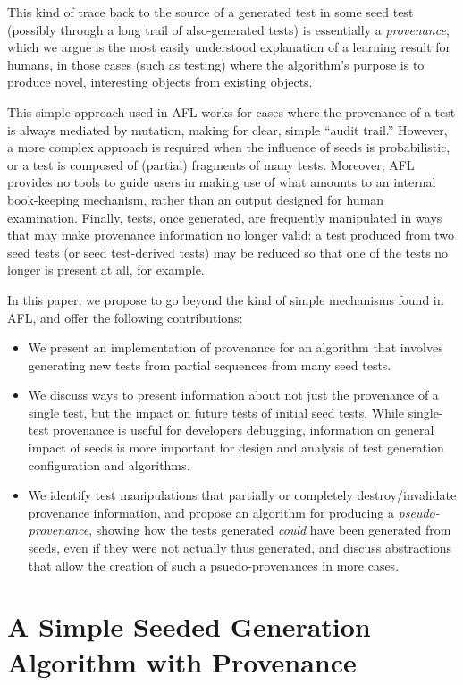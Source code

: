 \documentclass[final]{article}
\begin{document}
This kind of trace back to the source of a generated test in some seed
test (possibly through a long trail of also-generated tests) is
essentially a \emph{provenance}, which we argue is the most easily
understood explanation of a learning result for humans, in those cases
(such as testing) where the algorithm's purpose is to produce
novel, interesting objects from existing objects.

This simple approach used in AFL works for cases where the provenance of a test is
always mediated by mutation, making for clear, simple ``audit trail.''  However, a more complex approach is
required when the influence of seeds is probabilistic, or a test is
composed of (partial) fragments of many tests.  Moreover, AFL provides
no tools to guide users in making use of what amounts to an internal
book-keeping mechanism, rather than an output designed for human
examination.
Finally, tests, once generated, are frequently manipulated in ways
that may make provenance information no longer valid:  a test produced
from two seed tests (or seed test-derived tests) may be reduced
\cite{DD} so that one of the tests no longer is present at all, for example.

In this paper, we propose to go beyond the kind of simple mechanisms
found in AFL, and
offer the following contributions:

\begin{itemize}
\item We present an implementation of provenance for an algorithm that involves
  generating new tests from partial sequences from many seed tests.
\item We discuss ways to present information about not just the
  provenance of a single test, but the impact on future tests of
  initial seed tests.  While single-test provenance is useful for
  developers debugging, information on general impact of seeds is more
  important for design and analysis of test generation configuration
  and algorithms.
\item We identify test manipulations that partially or completely
  destroy/invalidate provenance information, and propose an algorithm
  for producing a \emph{pseudo-provenance}, showing how the tests generated
  \emph{could} have been generated from seeds, even if they were not actually
  thus generated, and discuss abstractions that allow the
  creation of such a psuedo-provenances in more cases.
\end{itemize}

\section{A Simple Seeded Generation Algorithm with Provenance}
\end{document}
